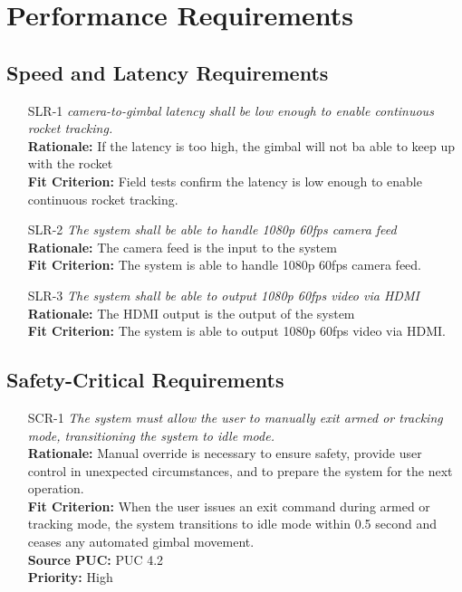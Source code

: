 \documentclass[12pt]{article}
\begin{document}
\section{Performance Requirements}
\subsection{Speed and Latency Requirements}
\begin{itemize}[leftmargin=*]
  \item[SLR-1] \emph{camera-to-gimbal latency shall be low enough to enable continuous
          rocket tracking.}\\[2mm]
        \textbf{Rationale:} If the latency is too high, the gimbal will not ba able to keep up with the rocket\\
        \textbf{Fit Criterion:} Field tests confirm the latency is low enough to enable continuous rocket tracking.

  \item[SLR-2] \emph{The system shall be able to handle 1080p 60fps camera feed}\\[2mm]
        \textbf{Rationale:} The camera feed is the input to the system\\
        \textbf{Fit Criterion:} The system is able to handle 1080p 60fps camera feed.

  \item[SLR-3] \emph{The system shall be able to output 1080p 60fps video via HDMI}\\[2mm]
        \textbf{Rationale:} The HDMI output is the output of the system\\
        \textbf{Fit Criterion:} The system is able to output 1080p 60fps video via HDMI.
\end{itemize}

\subsection{Safety-Critical Requirements}
\begin{itemize}[leftmargin=*]
  \item[SCR-1] \emph{The system must allow the user to manually exit armed or tracking
          mode, transitioning the system to idle mode.}\\[2mm]
        \textbf{Rationale:} Manual override is necessary to ensure safety, provide user control in unexpected circumstances, and to prepare the system for the next operation.\\
        \textbf{Fit Criterion:} When the user issues an exit command during armed or tracking mode, the system transitions to idle mode within 0.5 second and ceases any automated gimbal movement.\\
        \textbf{Source PUC:} PUC 4.2 \\
        \textbf{Priority:} High
\end{itemize}
\end{document}

